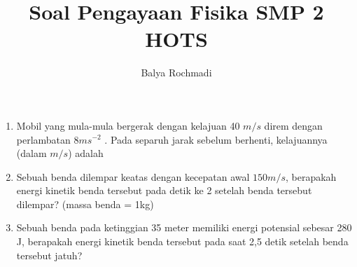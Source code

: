 \documentclass[12pt,a4paper,onecolumn]{article}
\author{Balya Rochmadi}
\title{\Large Soal Pengayaan Fisika SMP 2 HOTS}
\begin{document}
	\Large
	\maketitle
	\begin{enumerate}
		\item Mobil yang mula-mula bergerak dengan
		kelajuan 40 $m/s$ direm dengan perlambatan 8$ms^{-2}$ . Pada separuh jarak sebelum berhenti,
		kelajuannya (dalam $m/s$) adalah
		\item Sebuah benda dilempar keatas dengan kecepatan awal  $150 m/s$, berapakah energi kinetik benda tersebut pada detik ke 2 setelah benda tersebut dilempar? (massa benda = 1kg)
		\item Sebuah benda pada ketinggian 35 meter memiliki energi potensial sebesar 280 J, berapakah energi kinetik benda tersebut pada saat 2,5 detik setelah benda tersebut jatuh?

		
	\end{enumerate}
\end{document}
